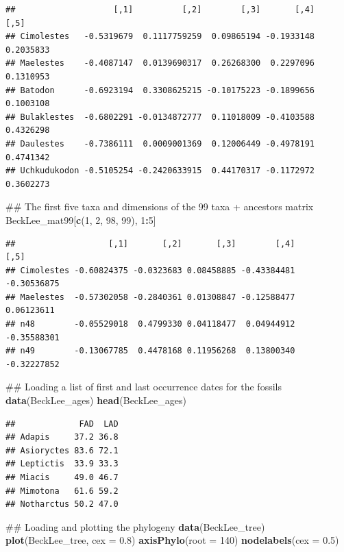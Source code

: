 \documentclass[]{book}
\newenvironment{Shaded}{\begin{snugshade}}{\end{snugshade}}
\newcommand{\KeywordTok}[1]{\textcolor[rgb]{0.13,0.29,0.53}{\textbf{#1}}}
\newcommand{\DataTypeTok}[1]{\textcolor[rgb]{0.13,0.29,0.53}{#1}}
\newcommand{\DecValTok}[1]{\textcolor[rgb]{0.00,0.00,0.81}{#1}}
\newcommand{\FloatTok}[1]{\textcolor[rgb]{0.00,0.00,0.81}{#1}}
\newcommand{\OperatorTok}[1]{\textcolor[rgb]{0.81,0.36,0.00}{\textbf{#1}}}
\newcommand{\NormalTok}[1]{#1}
\theoremstyle{definition}
\theoremstyle{definition}
\theoremstyle{definition}
\theoremstyle{remark}
\begin{document}
\begin{verbatim}
##                    [,1]          [,2]        [,3]       [,4]      [,5]
## Cimolestes   -0.5319679  0.1117759259  0.09865194 -0.1933148 0.2035833
## Maelestes    -0.4087147  0.0139690317  0.26268300  0.2297096 0.1310953
## Batodon      -0.6923194  0.3308625215 -0.10175223 -0.1899656 0.1003108
## Bulaklestes  -0.6802291 -0.0134872777  0.11018009 -0.4103588 0.4326298
## Daulestes    -0.7386111  0.0009001369  0.12006449 -0.4978191 0.4741342
## Uchkudukodon -0.5105254 -0.2420633915  0.44170317 -0.1172972 0.3602273
\end{verbatim}

\begin{Shaded}
\begin{Highlighting}[]
\NormalTok{## The first five taxa and dimensions of the 99 taxa + ancestors matrix}
\NormalTok{BeckLee_mat99[}\KeywordTok{c}\NormalTok{(}\DecValTok{1}\NormalTok{, }\DecValTok{2}\NormalTok{, }\DecValTok{98}\NormalTok{, }\DecValTok{99}\NormalTok{), }\DecValTok{1}\OperatorTok{:}\DecValTok{5}\NormalTok{]}
\end{Highlighting}
\end{Shaded}

\begin{verbatim}
##                   [,1]       [,2]       [,3]        [,4]        [,5]
## Cimolestes -0.60824375 -0.0323683 0.08458885 -0.43384481 -0.30536875
## Maelestes  -0.57302058 -0.2840361 0.01308847 -0.12588477  0.06123611
## n48        -0.05529018  0.4799330 0.04118477  0.04944912 -0.35588301
## n49        -0.13067785  0.4478168 0.11956268  0.13800340 -0.32227852
\end{verbatim}

\begin{Shaded}
\begin{Highlighting}[]
\NormalTok{## Loading a list of first and last occurrence dates for the fossils}
\KeywordTok{data}\NormalTok{(BeckLee_ages)}
\KeywordTok{head}\NormalTok{(BeckLee_ages)}
\end{Highlighting}
\end{Shaded}

\begin{verbatim}
##             FAD  LAD
## Adapis     37.2 36.8
## Asioryctes 83.6 72.1
## Leptictis  33.9 33.3
## Miacis     49.0 46.7
## Mimotona   61.6 59.2
## Notharctus 50.2 47.0
\end{verbatim}

\begin{Shaded}
\begin{Highlighting}[]
\NormalTok{## Loading and plotting the phylogeny}
\KeywordTok{data}\NormalTok{(BeckLee_tree)}
\KeywordTok{plot}\NormalTok{(BeckLee_tree, }\DataTypeTok{cex =} \FloatTok{0.8}\NormalTok{) }
\KeywordTok{axisPhylo}\NormalTok{(}\DataTypeTok{root =} \DecValTok{140}\NormalTok{)}
\KeywordTok{nodelabels}\NormalTok{(}\DataTypeTok{cex =} \FloatTok{0.5}\NormalTok{)}
\end{Highlighting}
\end{Shaded}
\end{document}
